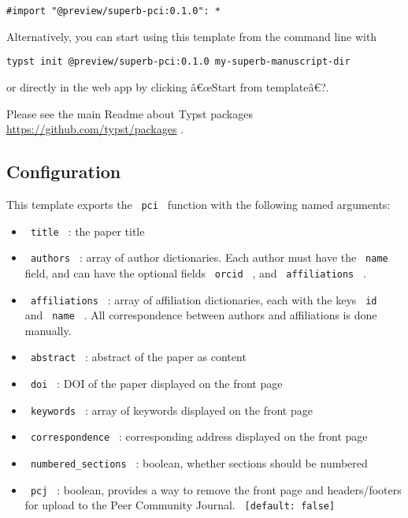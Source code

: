 \begin{verbatim}
#import "@preview/superb-pci:0.1.0": *
\end{verbatim}

Alternatively, you can start using this template from the command line
with

\begin{verbatim}
typst init @preview/superb-pci:0.1.0 my-superb-manuscript-dir
\end{verbatim}

or directly in the web app by clicking â€œStart from templateâ€?.

Please see the main Readme about Typst packages
\url{https://github.com/typst/packages} .

\subsection{Configuration}\label{configuration}

This template exports the \texttt{\ pci\ } function with the following
named arguments:

\begin{itemize}
\tightlist
\item
  \texttt{\ title\ } : the paper title
\item
  \texttt{\ authors\ } : array of author dictionaries. Each author must
  have the \texttt{\ name\ } field, and can have the optional fields
  \texttt{\ orcid\ } , and \texttt{\ affiliations\ } .
\item
  \texttt{\ affiliations\ } : array of affiliation dictionaries, each
  with the keys \texttt{\ id\ } and \texttt{\ name\ } . All
  correspondence between authors and affiliations is done manually.
\item
  \texttt{\ abstract\ } : abstract of the paper as content
\item
  \texttt{\ doi\ } : DOI of the paper displayed on the front page
\item
  \texttt{\ keywords\ } : array of keywords displayed on the front page
\item
  \texttt{\ correspondence\ } : corresponding address displayed on the
  front page
\item
  \texttt{\ numbered\_sections\ } : boolean, whether sections should be
  numbered
\item
  \texttt{\ pcj\ } : boolean, provides a way to remove the front page
  and headers/footers for upload to the Peer Community Journal.
  \texttt{\ {[}default:\ false{]}\ }
\end{itemize}

